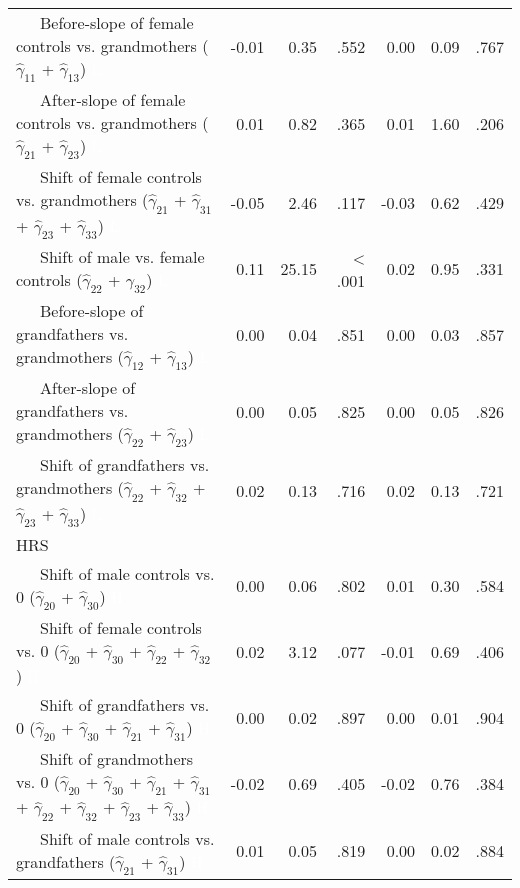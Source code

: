 \documentclass[
  english,
  man, noextraspace,floatsintext]{apa7}
\newenvironment{lltable}{\begin{landscape}\begin{center}\begin{ThreePartTable}}{\end{ThreePartTable}\end{center}\end{landscape}}
\begin{document}
\begin{appendix}
\begin{lltable}
{\begin{longtable}{lrrrrrr}
\ \ \ Before-slope of female controls vs. grandmothers 
($\hat{\gamma}_{11}$ + $\hat{\gamma}_{13}$) \textcolor{white}{L} & -0.01 & 0.35 & .552 & 0.00 & 0.09 & .767\\
\ \ \ After-slope of female controls vs. grandmothers 
($\hat{\gamma}_{21}$ + $\hat{\gamma}_{23}$) \textcolor{white}{L} & 0.01 & 0.82 & .365 & 0.01 & 1.60 & .206\\
\ \ \ Shift of female controls vs. grandmothers 
($\hat{\gamma}_{21}$ + $\hat{\gamma}_{31}$ + 
$\hat{\gamma}_{23}$ + $\hat{\gamma}_{33}$) \textcolor{white}{L} & -0.05 & 2.46 & .117 & -0.03 & 0.62 & .429\\
\ \ \ Shift of male vs. female controls 
($\hat{\gamma}_{22}$ + $\hat{\gamma}_{32}$) \textcolor{white}{L} & 0.11 & 25.15 & < .001 & 0.02 & 0.95 & .331\\
\ \ \ Before-slope of grandfathers vs. grandmothers 
($\hat{\gamma}_{12}$ + $\hat{\gamma}_{13}$) \textcolor{white}{L} & 0.00 & 0.04 & .851 & 0.00 & 0.03 & .857\\
\ \ \ After-slope of grandfathers vs. grandmothers 
($\hat{\gamma}_{22}$ + $\hat{\gamma}_{23}$) \textcolor{white}{L} & 0.00 & 0.05 & .825 & 0.00 & 0.05 & .826\\
\ \ \ Shift of grandfathers vs. grandmothers 
($\hat{\gamma}_{22}$ + $\hat{\gamma}_{32}$ + 
$\hat{\gamma}_{23}$ + $\hat{\gamma}_{33}$) \textcolor{white}{L} & 0.02 & 0.13 & .716 & 0.02 & 0.13 & .721\\
HRS &  &  &  &  &  & \\
\ \ \ Shift of male controls vs. 0 ($\hat{\gamma}_{20}$ + 
$\hat{\gamma}_{30}$) \textcolor{white}{H} & 0.00 & 0.06 & .802 & 0.01 & 0.30 & .584\\
\ \ \ Shift of female controls vs. 0 ($\hat{\gamma}_{20}$ + 
$\hat{\gamma}_{30}$ + $\hat{\gamma}_{22}$ + 
$\hat{\gamma}_{32}$) \textcolor{white}{H} & 0.02 & 3.12 & .077 & -0.01 & 0.69 & .406\\
\ \ \ Shift of grandfathers vs. 0 ($\hat{\gamma}_{20}$ + 
$\hat{\gamma}_{30}$ + $\hat{\gamma}_{21}$ + 
$\hat{\gamma}_{31}$) \textcolor{white}{H} & 0.00 & 0.02 & .897 & 0.00 & 0.01 & .904\\
\ \ \ Shift of grandmothers vs. 0 ($\hat{\gamma}_{20}$ + 
$\hat{\gamma}_{30}$ + $\hat{\gamma}_{21}$ + 
$\hat{\gamma}_{31}$ + $\hat{\gamma}_{22}$ + 
$\hat{\gamma}_{32}$ + $\hat{\gamma}_{23}$ +
$\hat{\gamma}_{33}$) \textcolor{white}{H} & -0.02 & 0.69 & .405 & -0.02 & 0.76 & .384\\
\ \ \ Shift of male controls vs. grandfathers 
($\hat{\gamma}_{21}$ + $\hat{\gamma}_{31}$) \textcolor{white}{H} & 0.01 & 0.05 & .819 & 0.00 & 0.02 & .884\\

\end{longtable}}
\end{lltable}
\end{appendix}
\end{document}

